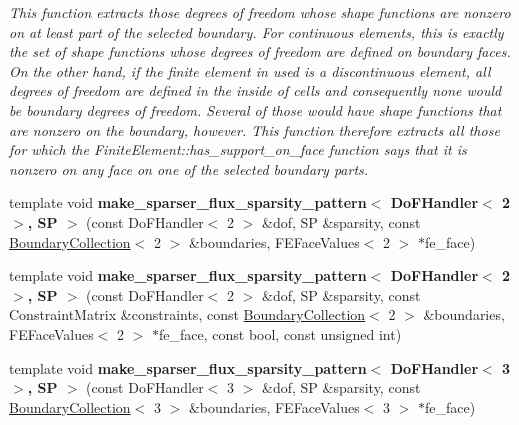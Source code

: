 \begin{DoxyCompactItemize}
\begin{DoxyCompactList}\small\item\em This function extracts those degrees of freedom whose shape functions are nonzero on at least part of the selected boundary. For continuous elements, this is exactly the set of shape functions whose degrees of freedom are defined on boundary faces. On the other hand, if the finite element in used is a discontinuous element, all degrees of freedom are defined in the inside of cells and consequently none would be boundary degrees of freedom. Several of those would have shape functions that are nonzero on the boundary, however. This function therefore extracts all those for which the FiniteElement::has\_\-support\_\-on\_\-face function says that it is nonzero on any face on one of the selected boundary parts. \item\end{DoxyCompactList}\item 
\hypertarget{namespacenatrium_1_1DealIIExtensions_a1114fe047dc504c301fade5677bcea1d}{
template void {\bfseries make\_\-sparser\_\-flux\_\-sparsity\_\-pattern$<$ DoFHandler$<$ 2 $>$, SP $>$} (const DoFHandler$<$ 2 $>$ \&dof, SP \&sparsity, const \hyperlink{classnatrium_1_1BoundaryCollection}{BoundaryCollection}$<$ 2 $>$ \&boundaries, FEFaceValues$<$ 2 $>$ $\ast$fe\_\-face)}
\label{namespacenatrium_1_1DealIIExtensions_a1114fe047dc504c301fade5677bcea1d}

\item 
\hypertarget{namespacenatrium_1_1DealIIExtensions_a9f6065aca54041aa9bd6ca3733478988}{
template void {\bfseries make\_\-sparser\_\-flux\_\-sparsity\_\-pattern$<$ DoFHandler$<$ 2 $>$, SP $>$} (const DoFHandler$<$ 2 $>$ \&dof, SP \&sparsity, const ConstraintMatrix \&constraints, const \hyperlink{classnatrium_1_1BoundaryCollection}{BoundaryCollection}$<$ 2 $>$ \&boundaries, FEFaceValues$<$ 2 $>$ $\ast$fe\_\-face, const bool, const unsigned int)}
\label{namespacenatrium_1_1DealIIExtensions_a9f6065aca54041aa9bd6ca3733478988}

\item 
\hypertarget{namespacenatrium_1_1DealIIExtensions_a33884e02520bb06cf29f3be01a2d7b42}{
template void {\bfseries make\_\-sparser\_\-flux\_\-sparsity\_\-pattern$<$ DoFHandler$<$ 3 $>$, SP $>$} (const DoFHandler$<$ 3 $>$ \&dof, SP \&sparsity, const \hyperlink{classnatrium_1_1BoundaryCollection}{BoundaryCollection}$<$ 3 $>$ \&boundaries, FEFaceValues$<$ 3 $>$ $\ast$fe\_\-face)}
\label{namespacenatrium_1_1DealIIExtensions_a33884e02520bb06cf29f3be01a2d7b42}


\end{DoxyCompactItemize}
